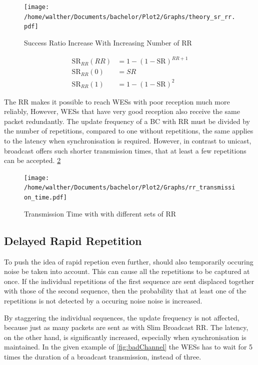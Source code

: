 \begin{figure}[h]
	\centering
	\texttt{[image: /home/walther/Documents/bachelor/Plot2/Graphs/theory\_sr\_rr.pdf]}
	\caption{Success Ratio Increase With Increasing Number of RR}
	\label{fig:theory_rr_sc}
\end{figure}

\begin{align}
	\label{math:rr_sr}
	\text{SR}_{RR}(RR)	&= 1-(1-\text{SR})^{RR+1} \\
	\text{SR}_{RR}(0) 	&= SR \\
	\text{SR}_{RR}(1) 	&= 1-(1-\text{SR})^{2}
\end{align}

The RR makes it possible to reach WESs with poor reception much more reliably,
However, WESs that have very good reception also receive the same packet redundantly.
The update frequency of a BC with RR must be divided by the number of repetitions, compared to one without repetitions,
the same applies to the latency when synchronisation is required.
However, in contrast to unicast, broadcast offers such shorter transmission times,
that at least a few repetitions can be accepted. \cref{fig:rr_analytic}

\begin{figure}[h]
	\centering
	\texttt{[image: /home/walther/Documents/bachelor/Plot2/Graphs/rr\_transmission\_time.pdf]}
	\caption{Transmission Time with with different sets of RR}
	\label{fig:rr_analytic}
\end{figure}

\subsection*{Delayed Rapid Repetition}
\label{sub:DelayedRepetition}

To push the idea of rapid repetion even further, should also temporarily occuring noise be taken into account.
This can cause all the repetitions to be captured at once.
If the individual repetitions of the first sequence are sent displaced together with those of the second sequence,
then the probability that at least one of the repetitions is not detected by a occuring noise noise is increased.

By staggering the individual sequences, the update frequency is not affected,
because just as many packets are sent as with Slim Broadcast RR.
The latency, on the other hand, is significantly increased, especially when synchronisation is maintained.
In the given example of \cref{fig:badChannel} the WESs has to wait for 5 times the duration of a broadcast transmission, instead of three.


